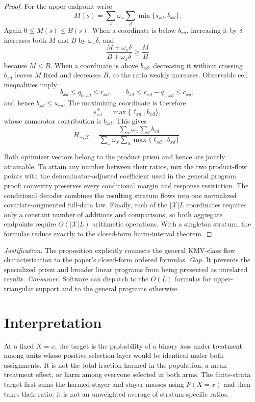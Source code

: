 \documentclass{article}
\begin{document}
\begin{proof}
For the upper endpoint write
\[
 M(s)=\sum_x\omega_x\sum_d\min\{s_{xd},b_{xd}\}.
\]
Again \(0\le M(s)\le B(s)\).  When a coordinate is below \(b_{xd}\), increasing it by \(\delta\) increases both \(M\) and \(B\) by \(\omega_x\delta\), and
\[
 \frac{M+\omega_x\delta}{B+\omega_x\delta}
 \ge\frac MB
\]
because \(M\le B\).  When a coordinate is above \(b_{xd}\), decreasing it without crossing \(b_{xd}\) leaves \(M\) fixed and decreases \(B\), so the ratio weakly increases.  Observable cell inequalities imply
\[
 b_{xd}\le q_{0,xd}\le r_{xd},
 \qquad
 b_{xd}\le c_{xd}-q_{1,xd}\le c_{xd},
\]
and hence \(b_{xd}\le u_{xd}\).  The maximizing coordinate is therefore
\[
 s_{xd}^+=\max\{\ell_{xd},b_{xd}\},
\]
whose numerator contribution is \(b_{xd}\).  This gives
\[
 H_{+,\mathcal X}=
 \frac{\sum_x\omega_x\sum_db_{xd}}
 {\sum_x\omega_x\sum_d\max\{\ell_{xd},b_{xd}\}}.
\]

Both optimizer vectors belong to the product prism and hence are jointly attainable.  To attain any number between their ratios, mix the two product-flow points with the denominator-adjusted coefficient used in the general program proof; convexity preserves every conditional margin and response restriction.  The conditional decoder combines the resulting stratum flows into one normalized covariate-augmented full-data law.  Finally, each of the \(|\mathcal X|L\) coordinates requires only a constant number of additions and comparisons, so both aggregate endpoints require \(O(|\mathcal X|L)\) arithmetic operations.  With a singleton stratum, the formulas reduce exactly to the closed-form harm-interval theorem.
\end{proof}
\par\smallskip\noindent \textit{Justification.} The proposition explicitly connects the general KMV-class flow characterization to the paper's closed-form ordered formulas. \textit{Gap.} It prevents the specialized prism and broader linear programs from being presented as unrelated results. \textit{Consumer.} Software can dispatch to the \(O(L)\) formulas for upper-triangular support and to the general programs otherwise.

\section{Interpretation}

At a fixed \(X=x\), the target is the probability of a binary loss under treatment among units whose positive selection layer would be identical under both assignments. It is not the total fraction harmed in the population, a mean treatment effect, or harm among everyone selected in both arms. The finite-strata target first sums the harmed-stayer and stayer masses using \(P(X=x)\) and then takes their ratio; it is not an unweighted average of stratum-specific ratios.
\end{document}
